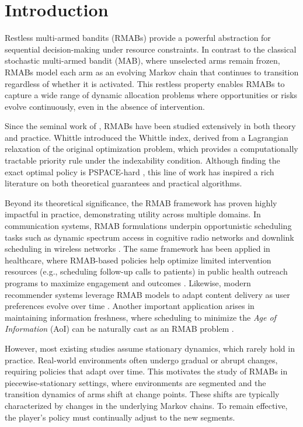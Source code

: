 \documentclass[twoside]{article}
\theoremstyle{plain}
\theoremstyle{definition}
\theoremstyle{remark}
\begin{document}
\section{Introduction}
\label{sec:intro}
\vspace{-5pt}
Restless multi-armed bandits (RMABs) provide a powerful abstraction for sequential decision-making under resource constraints. In contrast to the classical stochastic multi-armed bandit (MAB), where unselected arms remain frozen, RMABs model each arm as an evolving Markov chain that continues to transition regardless of whether it is activated. This restless property enables RMABs to capture a wide range of dynamic allocation problems where opportunities or risks evolve continuously, even in the absence of intervention.

Since the seminal work of \citet{Whittle1988RestlessBA}, RMABs have been studied extensively in both theory and practice. Whittle introduced the Whittle index, derived from a Lagrangian relaxation of the original optimization problem, which provides a computationally tractable priority rule under the indexability condition. Although finding the exact optimal policy is PSPACE-hard \citep{PSPACE_hard}, this line of work has inspired a rich literature on both theoretical guarantees and practical algorithms.

Beyond its theoretical significance, the RMAB framework has proven highly impactful in practice, demonstrating utility across multiple domains. In communication systems, RMAB formulations underpin opportunistic scheduling tasks such as dynamic spectrum access in cognitive radio networks and downlink scheduling in wireless networks \citep{2008qingzhao}. The same framework has been applied in healthcare, where RMAB-based policies help optimize limited intervention resources (e.g., scheduling follow-up calls to patients) in public health outreach programs to maximize engagement and outcomes \citep{2022healthcare}. Likewise, modern recommender systems leverage RMAB models to adapt content delivery as user preferences evolve over time \citep{2017recommender}. Another important application arises in maintaining information freshness, where scheduling to minimize the \emph{Age of Information} (AoI) can be naturally cast as an RMAB problem \citep{hsu2018age}.

However, most existing studies assume stationary dynamics, which rarely hold in practice. Real-world environments often undergo gradual or abrupt changes, requiring policies that adapt over time. This motivates the study of RMABs in piecewise-stationary settings, where environments are segmented and the transition dynamics of arms shift at change points. These shifts are typically characterized by changes in the underlying Markov chains. To remain effective, the player’s policy must continually adjust to the new segments.
\end{document}
